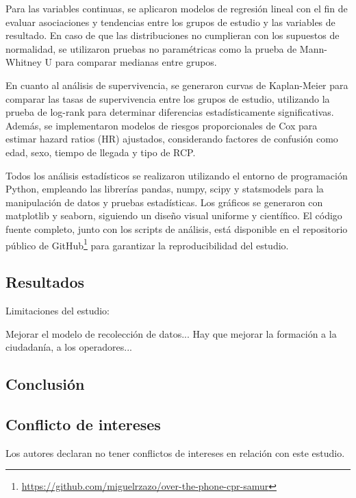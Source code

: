 \documentclass[10pt,a4paper]{article}
\begin{document}
\begin{multicols}{2}
Para las variables continuas, se aplicaron modelos de regresión lineal con el fin de evaluar asociaciones y tendencias entre los grupos de estudio y las variables de resultado. En caso de que las distribuciones no cumplieran con los supuestos de normalidad, se utilizaron pruebas no paramétricas como la prueba de Mann-Whitney U para comparar medianas entre grupos.

En cuanto al análisis de supervivencia, se generaron curvas de Kaplan-Meier para comparar las tasas de supervivencia entre los grupos de estudio, utilizando la prueba de log-rank para determinar diferencias estadísticamente significativas. Además, se implementaron modelos de riesgos proporcionales de Cox para estimar hazard ratios (HR) ajustados, considerando factores de confusión como edad, sexo, tiempo de llegada y tipo de RCP.

Todos los análisis estadísticos se realizaron utilizando el entorno de programación Python, empleando las librerías pandas, numpy, scipy y statsmodels para la manipulación de datos y pruebas estadísticas. Los gráficos se generaron con matplotlib y seaborn, siguiendo un diseño visual uniforme y científico. El código fuente completo, junto con los scripts de análisis, está disponible en el repositorio público de GitHub\footnote{\url{https://github.com/miguelrzazo/over-the-phone-cpr-samur}} para garantizar la reproducibilidad del estudio.


\end{multicols}
\onecolumn

\begin{multicols}{2}


\subsection*{Resultados}



Limitaciones del estudio:


Mejorar el modelo de recolección de datos...
Hay que mejorar la formación a la ciudadanía, a los operadores...

\subsection*{Conclusión}



\subsection*{Conflicto de intereses}
Los autores declaran no tener conflictos de intereses en relación con este estudio.

\newpage

\begin{thebibliography}{99}


\end{thebibliography}

\end{multicols}
\end{document}
